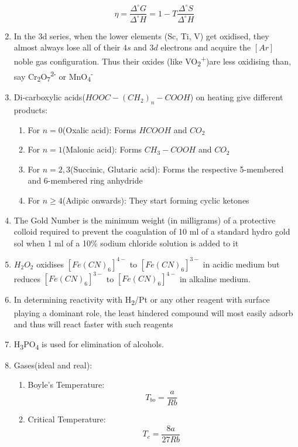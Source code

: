 \documentclass{article}
\numberwithin{equation}{section}
\numberwithin{figure}{section}
\newcommand{\Sub}[1]{\textsubscript{#1}}
\newcommand{\Sup}[1]{\textsuperscript{#1}}
\begin{document}
\begin{enumerate}
		\begin{equation}
			\eta=\frac{\Delta^{\circ}G}{\Delta^{\circ}H}=1-T\frac{\Delta^{\circ}S}{\Delta^{\circ}H}
		\end{equation}
	\item In the 3d series, when the lower elements (Sc, Ti, V) get oxidised, they almost always lose all of their $4s$ and $3d$ electrons and acquire the $[Ar]$ noble gas configuration. Thus their oxides (like VO\Sub{2}\Sup{+})are less oxidising than, say Cr\Sub{2}O\Sub{7}\Sup{2-} or MnO\Sub{4}\Sup{-}
	\item Di-carboxylic acids($HOOC-(CH_2)_{n}-COOH$) on heating give different products:
		\begin{enumerate}
			\item For $n=0$(Oxalic acid): Forms $HCOOH$ and $CO_2$
			\item For $n=1$(Malonic acid): Forms $CH_3-COOH$ and $CO_2$
			\item For $n=2,3$(Succinic, Glutaric acid): Forms the respective 5-membered and 6-membered ring anhydride
			\item For $n\geq 4$(Adipic onwards): They start forming cyclic ketones
		\end{enumerate}
	\item The Gold Number is the minimum weight (in milligrams) of a protective colloid required to prevent the coagulation of 10 ml of a standard hydro gold sol when 1 ml of a 10\% sodium chloride solution is added to it
	\item $H_2 O_2$ oxidises $[Fe (CN)_6]^{4-}$ to $[Fe(CN)_6]^{3-}$ in acidic medium but reduces $[Fe(CN)_6]^{3-}$ to $[Fe(CN)_6]^{4-}$ in alkaline medium.
	\item In determining reactivity with H\Sub{2}/Pt or any other reagent with surface playing a dominant role, the least hindered compound will most easily adsorb and thus will react faster with such reagents
	\item H\Sub{3}PO\Sub{4} is used for elimination of alcohols.
	\item Gases(ideal and real):
		\begin{enumerate}
			\item Boyle's Temperature:
				\begin{equation}
					T_{bo}=\frac{a}{Rb}
				\end{equation}
			\item Critical Temperature:
				\begin{equation}
					T_{c}=\frac{8a}{27 Rb}
				\end{equation}

\end{enumerate}
\end{enumerate}
\end{document}
